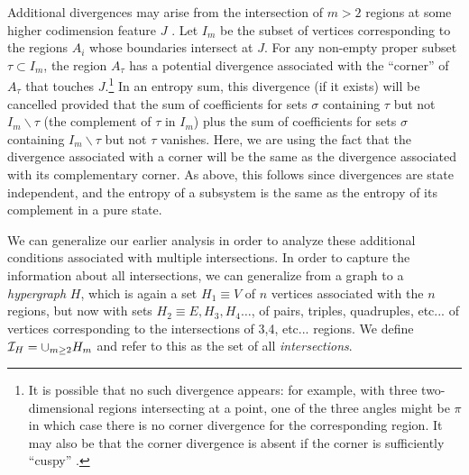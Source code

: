 \documentclass[12pt]{article}
\theoremstyle{definition}
\begin{document}
Additional divergences may arise from the intersection of $m>2$ regions at some higher codimension feature $J$ \cite{CasiniHuerta2007_Universal2p1,CasiniHuerta2009_Review,BuenoMyersWitczak2015_PRL,BuenoMyers2015_JHEP,BuenoMyersWitczak2015_Twist,KallinEtAl2014_JStatMech,StoudenmireEtAl2014_PRB,HaywardSierensEtAl2017_TrihedralPRB,BednikEtAl2019_TrihedralPRB,SeminaraSistiTonni2017_BCFT,Berthiere2019_BoundaryCornerPRB,Nishioka2018_RMP}. Let $I_m$ be the subset of vertices corresponding to the regions $A_i$ whose boundaries intersect at $J$. For any non-empty proper subset $\tau \subset I_m$, the region $A_\tau$ has a potential divergence associated with the ``corner'' of $A_\tau$ that touches $J$.\footnote{It is possible that no such divergence appears: for example, with three two-dimensional regions intersecting at a point, one of the three angles might be $\pi$ in which case there is no corner divergence for the corresponding region. It may also be that the corner divergence is absent if the corner is sufficiently ``cuspy'' \cite{BuenoCasiniWitczak2019_SingularJHEP}.} In an entropy sum, this divergence (if it exists) will be cancelled provided that the sum of coefficients for sets $\sigma$ containing $\tau$ but not $I_m \backslash \tau$ (the complement of $\tau$ in $I_m$) plus the sum of coefficients for sets $\sigma$ containing $I_m \backslash \tau$ but not $\tau$ vanishes. Here, we are using the fact that the divergence associated with a corner will be the same as the divergence associated with its complementary corner. As above, this follows since divergences are state independent, and the entropy of a subsystem is the same as the entropy of its complement in a pure state. 

We can generalize our earlier analysis in order to analyze these additional conditions associated with multiple intersections. In order to capture the information about all intersections, we can generalize from a graph to a {\it hypergraph} $H$, which is again a set $H_1 \equiv V$ of $n$ vertices associated with the $n$ regions, but now with sets $H_2 \equiv E, H_3, H_4 \dots$, of pairs, triples, quadruples, etc... of vertices corresponding to the intersections of 3,4, etc... regions. We define ${\cal I}_H = \cup_{m \ge 2} H_m$ and refer to this as the set of all {\it intersections}.
\end{document}
